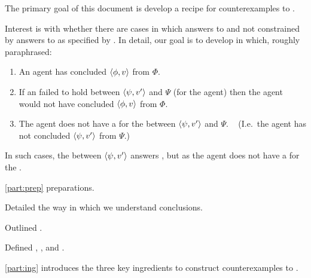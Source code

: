 \begin{note}
  The primary goal of this document is develop a recipe for counterexamples to \issueConstraint{}.

  Interest is with whether there are cases in which answers to \qWhyV{} and not constrained by answers to \qHowV{} as specified by \issueConstraint{}.
  In detail, our goal is to develop  in which, roughly paraphrased:

  \begin{enumerate}
  \item
    An agent has concluded \(\langle \phi, v \rangle\) from \(\Phi\).
  \item
    If an \ros{} failed to hold between \(\langle \psi, v' \rangle\) and \(\Psi\) (for the agent) then the agent would not have concluded \(\langle \phi, v \rangle\) from \(\Phi\).
  \item
    The agent does not have a \wit{} for the \ros{} between \(\langle \psi, v' \rangle\) and \(\Psi\).%
    \mbox{ }\hfill%
    (I.e.\ the agent has not concluded \(\langle \psi, v' \rangle\) from \(\Psi\).)
  \end{enumerate}

  In such cases, the \ros{} between \(\langle \psi, v' \rangle\) answers \qWhyV{}, but as the agent does not have a \wit{} for the \ros{}.
\end{note}

\begin{note}
  \autoref{part:prep} preparations.

  \begin{TOCEnum}
  \item

    Detailed the way in which we understand conclusions.
  \item

    Outlined .
  \item

    Defined \qWhyV{}, \qHowV{}, and \issueConstraint{}.
  \end{TOCEnum}
\end{note}

\begin{note}
  \autoref{part:ing} introduces the three key ingredients to construct counterexamples to \issueConstraint{}.

  \begin{TOCEnum}
  \item
  \item
  \item
  \end{TOCEnum}

\end{note}

